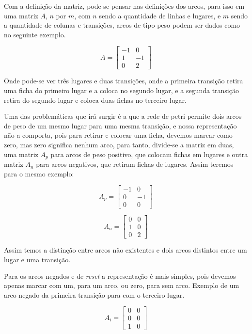 Com a definição da matriz, pode-se pensar nas definições dos arcos, para isso em uma matriz $A$, $n$ por $m$, com $n$ sendo a quantidade de linhas e lugares, e $m$ sendo a quantidade de colunas e transições, arcos de tipo peso podem ser dados como no seguinte exemplo.

$$ A = 
\begin{bmatrix}
	-1 & 0\\
	 1 & -1\\
	 0 & 2
\end{bmatrix}
$$

Onde pode-se ver três lugares e duas transições, onde a primeira transição retira uma ficha do primeiro lugar e a coloca no segundo lugar, e a segunda transição retira do segundo lugar e coloca duas fichas no terceiro lugar.

Uma das problemáticas que irá surgir é a que a rede de petri permite dois arcos de peso de um mesmo lugar para uma mesma transição, e nossa representação não a comporta, pois para retirar e colocar uma ficha, devemos marcar como zero, mas zero significa nenhum arco, para tanto, divide-se a matriz em duas, uma matriz $A_p$ para arcos de peso positivo, que colocam fichas em lugares e outra matriz $A_n$ para arcos negativos, que retiram fichas de lugares. Assim teremos para o mesmo exemplo: 

$$ A_p =
\begin{bmatrix}
	-1 & 0\\
	 0 & -1\\
	 0 & 0
\end{bmatrix}
$$

$$ A_n =
\begin{bmatrix}
	 0 & 0\\
	 1 & 0\\
	 0 & 2
\end{bmatrix}
$$

Assim temos a distinção entre arcos não existentes e dois arcos distintos entre um lugar e uma transição. 

Para os arcos negados e de \textit{reset} a representação é mais simples, pois devemos apenas marcar com um, para um arco, ou zero, para sem arco. Exemplo de um arco negado da primeira transição para com o terceiro lugar.

$$ A_i =
\begin{bmatrix}
	 0 & 0\\
	 0 & 0\\
	 1 & 0
\end{bmatrix}
$$


